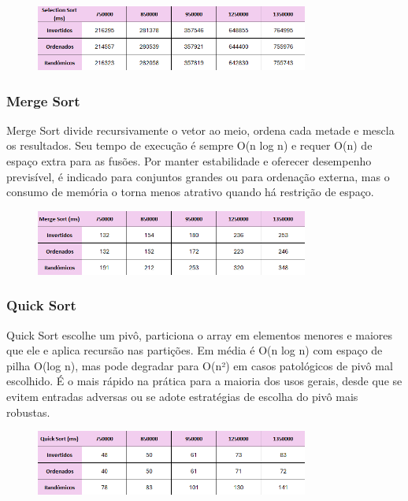 \documentclass[a4paper, 12pt]{article}
\begin{document}
            \begin{figure}[ht]
                \centering
                \includegraphics[width=0.8\textwidth]{images/selection.png}
            \end{figure}

        \subsubsection{Merge Sort}
            Merge Sort divide recursivamente o vetor ao meio, ordena cada metade e mescla os resultados. Seu tempo de execução é sempre O(n log n) e requer O(n) de espaço extra para as fusões. Por manter estabilidade e oferecer desempenho previsível, é indicado para conjuntos grandes ou para ordenação externa, mas o consumo de memória o torna menos atrativo quando há restrição de espaço.

            \begin{figure}[h]
                \centering
                \includegraphics[width=0.8\textwidth]{images/merge.png}
            \end{figure}

        \subsubsection{Quick Sort}
            Quick Sort escolhe um pivô, particiona o array em elementos menores e maiores que ele e aplica recursão nas partições. Em média é O(n log n) com espaço de pilha O(log n), mas pode degradar para O(n²) em casos patológicos de pivô mal escolhido. É o mais rápido na prática para a maioria dos usos gerais, desde que se evitem entradas adversas ou se adote estratégias de escolha do pivô mais robustas.

            \begin{figure}[ht]
                \centering
                \includegraphics[width=0.8\textwidth]{images/quick.png}
            \end{figure}
\end{document}
